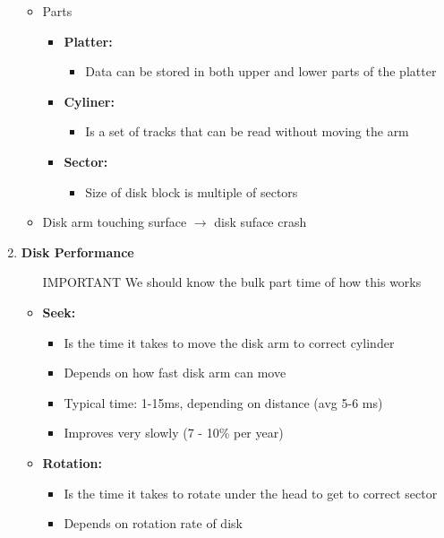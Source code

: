 \documentclass[12pt]{article}
\begin{document}
\begin{enumerate}[1.]
    \begin{itemize}
        \item Parts
        \begin{itemize}
            \item \textbf{Platter:}
            \begin{itemize}
                \item Data can be stored in both upper and lower parts of the platter
            \end{itemize}
            \item \textbf{Cyliner:}
            \begin{itemize}
                \item Is a set of tracks that can be read without moving the arm
            \end{itemize}
            \item \textbf{Sector:}
            \begin{itemize}
                \item Size of disk block is multiple of sectors
            \end{itemize}
        \end{itemize}
        \item Disk arm touching surface $\to$ disk suface crash
    \end{itemize}
    \item \textbf{Disk Performance}
    \begin{itemize}
        \item [\color{red}IMPORTANT\color{black}] We should know the bulk part time of how this works
        \item \textbf{Seek:}
        \begin{itemize}
            \item Is the time it takes to move the disk arm to correct cylinder
            \item Depends on how fast disk arm can move
            \item Typical time: 1-15ms, depending on distance (avg 5-6 ms)
            \item Improves very slowly (7 - 10\% per year)
        \end{itemize}
        \item \textbf{Rotation:}
        \begin{itemize}
            \item Is the time it takes to rotate under the head to get to correct sector
            \item Depends on rotation rate of disk

\end{itemize}
\end{itemize}
\end{enumerate}
\end{document}

